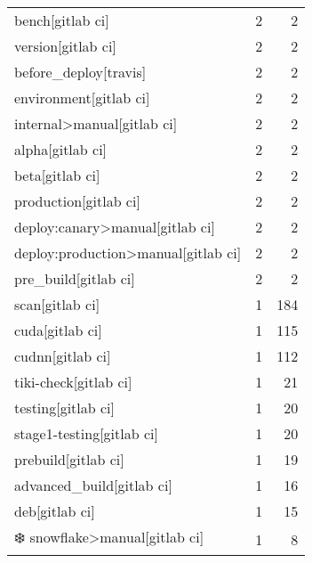 \begin{tabular}{lrr}
bench[gitlab ci]                           &                   2 &             2 \\
version[gitlab ci]                         &                   2 &             2 \\
before\_deploy[travis]                      &                   2 &             2 \\
environment[gitlab ci]                     &                   2 &             2 \\
internal>manual[gitlab ci]                 &                   2 &             2 \\
alpha[gitlab ci]                           &                   2 &             2 \\
beta[gitlab ci]                            &                   2 &             2 \\
production[gitlab ci]                      &                   2 &             2 \\
deploy:canary>manual[gitlab ci]            &                   2 &             2 \\
deploy:production>manual[gitlab ci]        &                   2 &             2 \\
pre\_build[gitlab ci]                       &                   2 &             2 \\
scan[gitlab ci]                            &                   1 &           184 \\
cuda[gitlab ci]                            &                   1 &           115 \\
cudnn[gitlab ci]                           &                   1 &           112 \\
tiki-check[gitlab ci]                      &                   1 &            21 \\
testing[gitlab ci]                         &                   1 &            20 \\
stage1-testing[gitlab ci]                  &                   1 &            20 \\
prebuild[gitlab ci]                        &                   1 &            19 \\
advanced\_build[gitlab ci]                  &                   1 &            16 \\
deb[gitlab ci]                             &                   1 &            15 \\
❄️ snowflake>manual[gitlab ci]             &                   1 &             8 \\

\end{tabular}
